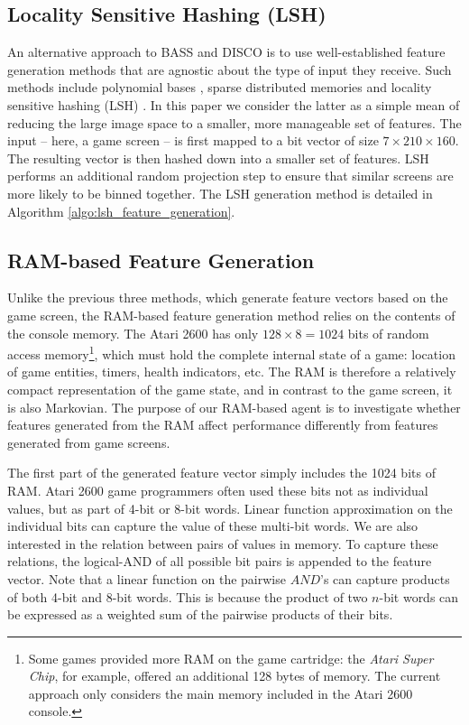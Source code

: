 \documentclass[twoside,11pt]{article}
\begin{document}
\subsection{Locality Sensitive Hashing (LSH)}

An alternative approach to BASS and DISCO is to use well-established feature generation methods that are agnostic about the type of input they receive. Such methods include polynomial bases \cite{schweitzer_85}, sparse distributed memories \cite{kanerva_88} and locality sensitive hashing (LSH) \cite{gionis_99}. In this paper we consider the latter as a simple mean of reducing the large image space to a smaller, more manageable set of features. The input -- here, a game screen -- is first mapped to a bit vector of size $7 \times 210 \times 160$. The resulting vector is then hashed down into a smaller set of features. LSH performs an additional random projection step to ensure that similar screens are more likely to be binned together. The LSH generation method is detailed in Algorithm \ref{algo:lsh_feature_generation}. 
\subsection{RAM-based Feature Generation}
\label{sec:agents:rl:ram}
Unlike the previous three methods, which generate feature vectors based on the game screen, the RAM-based feature generation method relies on the contents of the console memory. The Atari 2600 has only $128 \times 8 = 1024$ bits of random access memory\footnote{Some games provided more RAM on the game cartridge: the \emph{Atari Super Chip}, for example, offered an additional 128 bytes of memory. The current approach only considers the main memory included in the Atari 2600 console.}, which must hold the complete internal state of a game: location of game entities, timers, health indicators, etc. The RAM is therefore a relatively compact representation of the game state, and in contrast to the game screen, it is also Markovian. The purpose of our RAM-based agent is to investigate whether features generated from the RAM affect performance differently from features generated from game screens. 

The first part of the generated feature vector simply includes the 1024 bits of RAM. Atari 2600 game programmers often used these bits not as individual values, but as part of 4-bit or 8-bit words. Linear function approximation on the individual bits can capture the value of these multi-bit words. We are also interested in the relation between pairs of values in memory. To capture these relations, the logical-AND of all possible bit pairs is appended to the feature vector. Note that a linear function on the pairwise $AND$'s can capture products of both 4-bit and 8-bit words. This is because the product of two $n$-bit words can be expressed as a weighted sum of the pairwise products of their bits.
\end{document}
